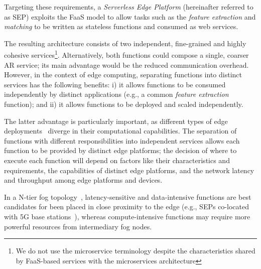 Targeting these requirements, a \textit{Serverless Edge Platform} (hereinafter referred to as SEP) exploits the FaaS model to allow tasks such as the \textit{feature extraction} and \textit{matching} to be written as stateless functions and consumed as web services. 

The resulting architecture consists of two independent, fine-grained and highly cohesive services\footnote{We do not use the microservice terminology despite the  characteristics shared by FaaS-based services with the microservices architecture}. 
Alternatively, both functions could compose a single, coarser AR service; its main advantage would be the reduced communication overhead. However, in the context of edge computing, separating functions into distinct services has the following benefits:
i) it allows functions to be consumed independently by distinct applications (e.g., a common \textit{feature extraction} function); and ii) it allows functions to be deployed and scaled independently.%

The latter advantage is particularly important, as different types of edge deployments~\cite{Satyanarayanan:2009,Taleb:2013,Liu:2014} 
diverge in their computational capabilities. The separation of functions with different responsibilities 
into independent services allows each function to be provided by distinct edge platforms; the decision of where to execute each function will depend on factors like their characteristics and requirements, the capabilities of distinct edge platforms, and the network latency and throughput among edge platforms and devices. 

In a N-tier fog topology~\cite{OpenFog:RA:2017}, latency-sensitive and data-intensive functions are best candidates for been placed in close proximity to the edge (e.g., SEPs co-located with 5G base stations~\cite{ETSI:MEC:2016:03}), whereas compute-intensive functions may require more powerful resources from intermediary fog nodes. 

